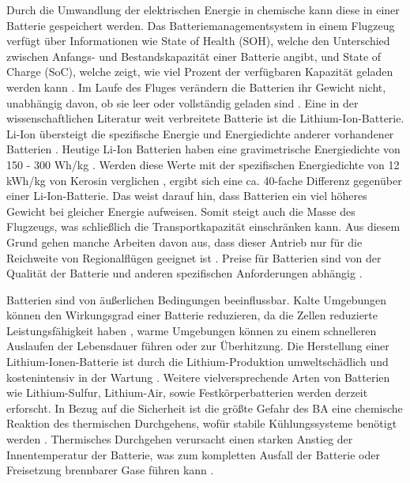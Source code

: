 Durch die Umwandlung der elektrischen Energie in chemische kann diese in einer Batterie gespeichert werden. 
Das Batteriemanagementsystem in einem Flugzeug verfügt über Informationen wie State of Health (SOH), 
welche den Unterschied zwischen Anfangs- und Bestandskapazität einer Batterie angibt, 
und State of Charge (SoC), welche zeigt, wie viel Prozent der verfügbaren Kapazität geladen werden kann \cite{donckers2024electric}.
Im Laufe des Fluges verändern die Batterien ihr Gewicht nicht, unabhängig davon, ob sie leer oder vollständig geladen sind \cite{donckers2024electric}. 
Eine in der wissenschaftlichen Literatur weit verbreitete Batterie ist die Lithium-Ion-Batterie.  
Li-Ion übersteigt die spezifische Energie und Energiedichte anderer vorhandener Batterien \cite{budde2013review}.
%
Heutige Li-Ion Batterien haben eine gravimetrische Energiedichte von 150 - 300 Wh/kg \cite{colpan2022fuel}. 
Werden diese Werte mit der spezifischen Energiedichte von 12 kWh/kg von Kerosin verglichen \cite{dalmia2022powering},
ergibt sich eine ca. 40-fache Differenz gegenüber einer Li-Ion-Batterie. 
Das weist darauf hin, dass Batterien ein viel höheres Gewicht bei gleicher Energie aufweisen. 
Somit steigt auch die Masse des Flugzeugs, was schließlich die Transportkapazität einschränken kann. 
Aus diesem Grund gehen manche Arbeiten davon aus, dass dieser Antrieb 
nur für die Reichweite von Regionalflügen geeignet ist \cite{abrantes2024impact}.
Preise für Batterien sind von der Qualität der Batterie und anderen spezifischen Anforderungen abhängig \cite{budde2013review}.

%
Batterien sind von äußerlichen Bedingungen beeinflussbar. 
Kalte Umgebungen können den Wirkungsgrad einer Batterie reduzieren, da die Zellen reduzierte Leistungsfähigkeit haben \cite{budde2013review}, 
warme Umgebungen können zu einem schnelleren Auslaufen der Lebensdauer führen \cite{donckers2024electric} oder zur Überhitzung. 
Die Herstellung einer Lithium-Ionen-Batterie ist durch die Lithium-Produktion umweltschädlich 
und kostenintensiv in der Wartung \cite{dalmia2022powering}. 
Weitere vielversprechende Arten von Batterien wie 
Lithium-Sulfur, Lithium-Air, sowie Festkörperbatterien werden derzeit erforscht.
%
%
%
In Bezug auf die Sicherheit ist die größte Gefahr des BA eine chemische Reaktion des thermischen Durchgehens, 
wofür stabile Kühlungssysteme benötigt werden \cite{donckers2024electric}. 
Thermisches Durchgehen verursacht einen starken Anstieg der Innentemperatur der Batterie, 
was zum kompletten Ausfall der Batterie oder Freisetzung brennbarer Gase führen kann \cite{shahid2022review}.


